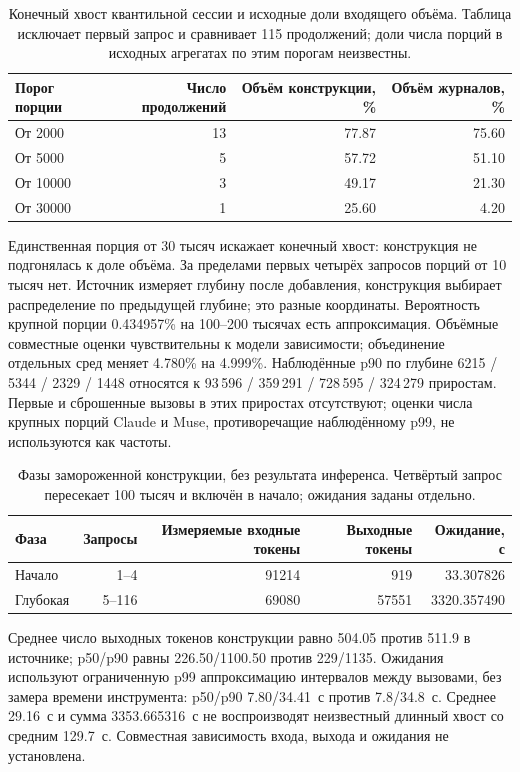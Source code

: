 \begin{table}[t]
\centering
\caption{Конечный хвост квантильной сессии и исходные доли входящего объёма.
Таблица исключает первый запрос и сравнивает 115 продолжений;
доли числа порций в исходных агрегатах по этим порогам неизвестны.}
\label{tab:lifecycle-tail}
\footnotesize
\begin{tabular}{lrrr}
\toprule
Порог порции & Число продолжений & Объём конструкции, \% & Объём журналов, \% \\
\midrule
От 2000 & 13 & 77.87 & 75.60 \\
От 5000 & 5 & 57.72 & 51.10 \\
От 10000 & 3 & 49.17 & 21.30 \\
От 30000 & 1 & 25.60 & 4.20 \\
\bottomrule
\end{tabular}
\end{table}

Единственная порция от 30 тысяч искажает конечный хвост: конструкция не подгонялась к доле объёма.
За пределами первых четырёх запросов порций от 10 тысяч нет.
Источник измеряет глубину после добавления, конструкция выбирает распределение по предыдущей глубине;
это разные координаты. Вероятность крупной порции 0.434957\% на 100--200 тысячах есть аппроксимация.
Объёмные совместные оценки чувствительны к модели зависимости; объединение отдельных сред меняет 4.780\% на 4.999\%.
Наблюдённые p90 по глубине 6215 / 5344 / 2329 / 1448 относятся к 93\,596 / 359\,291 / 728\,595 / 324\,279 приростам.
Первые и сброшенные вызовы в этих приростах отсутствуют; оценки числа крупных порций Claude и Muse,
противоречащие наблюдённому p99, не используются как частоты.

\begin{table}[t]
\centering
\caption{Фазы замороженной конструкции, без результата инференса.
Четвёртый запрос пересекает 100 тысяч и включён в начало; ожидания заданы отдельно.}
\label{tab:lifecycle-phases}
\footnotesize
\begin{tabular}{lrrrr}
\toprule
Фаза & Запросы & Измеряемые входные токены & Выходные токены & Ожидание, с \\
\midrule
Начало & 1--4 & 91214 & 919 & 33.307826 \\
Глубокая & 5--116 & 69080 & 57551 & 3320.357490 \\
\bottomrule
\end{tabular}
\end{table}

Среднее число выходных токенов конструкции равно 504.05 против 511.9 в источнике;
p50/p90 равны 226.50/1100.50 против 229/1135.
Ожидания используют ограниченную p99 аппроксимацию интервалов между вызовами,
без замера времени инструмента: p50/p90 7.80/34.41~с против 7.8/34.8~с.
Среднее 29.16~с и сумма 3353.665316~с не воспроизводят неизвестный длинный хвост со средним 129.7~с.
Совместная зависимость входа, выхода и ожидания не установлена.

